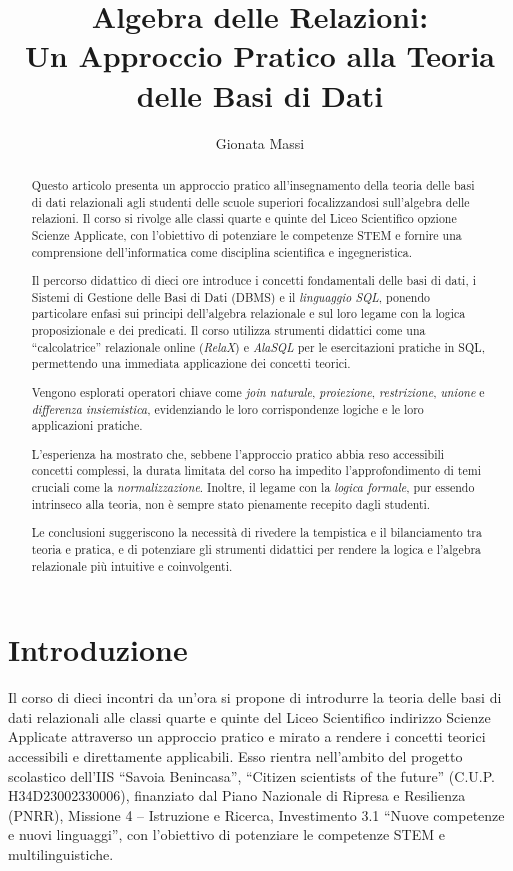 \documentclass[withtimes]{easychair}
\title{Algebra delle Relazioni:\\Un Approccio Pratico alla Teoria delle
Basi di Dati}
\author{
Gionata Massi%
}
\institute{
   Istituto di Istruzione Superiore Savoia Benincasa\\
   Ancona, Italia\\
   \email{gionata.massi@savoiabenincasa.it}
}
\theoremstyle{definition}
\begin{document}
\maketitle


\begin{abstract}
Questo articolo presenta un approccio pratico all'insegnamento della teoria delle basi di dati relazionali agli studenti delle scuole superiori focalizzandosi sull'algebra delle relazioni. Il corso si rivolge alle classi quarte e quinte del Liceo Scientifico opzione Scienze Applicate, con l'obiettivo di potenziare le competenze STEM e fornire una comprensione  dell'informatica come disciplina scientifica e ingegneristica.

Il percorso didattico di dieci ore introduce i concetti fondamentali delle basi di dati, i Sistemi di Gestione delle Basi di Dati (DBMS) e il \emph{linguaggio SQL}, ponendo particolare enfasi sui principi dell'algebra relazionale e sul loro legame con la logica proposizionale e dei predicati. Il corso utilizza strumenti didattici come una ``calcolatrice'' relazionale online (\emph{RelaX}) e \emph{AlaSQL} per le esercitazioni pratiche in SQL, permettendo una immediata applicazione dei concetti teorici.

Vengono esplorati operatori chiave come \emph{join naturale}, \emph{proiezione}, \emph{restrizione}, \emph{unione} e \emph{differenza insiemistica}, evidenziando le loro corrispondenze logiche e le loro applicazioni pratiche.

L'esperienza ha mostrato che, sebbene l'approccio pratico abbia reso accessibili concetti complessi, la durata  limitata del corso ha impedito l'approfondimento di temi cruciali come la \emph{normalizzazione}. Inoltre, il legame con la \emph{logica formale}, pur essendo intrinseco alla teoria, non è sempre stato pienamente recepito dagli studenti.

Le conclusioni suggeriscono la necessità di rivedere la tempistica e il bilanciamento tra teoria e pratica, e di potenziare gli strumenti didattici per rendere la logica e l'algebra relazionale più intuitive e coinvolgenti.
\end{abstract}

\section{Introduzione}\label{introduzione}

Il corso di dieci incontri da un'ora si propone di introdurre la teoria delle basi di dati relazionali alle classi quarte e quinte del Liceo Scientifico indirizzo Scienze Applicate attraverso un approccio pratico e mirato a rendere i concetti teorici accessibili e direttamente applicabili. Esso rientra nell'ambito del progetto scolastico dell'IIS ``Savoia Benincasa'', ``Citizen scientists of the future'' (C.U.P. H34D23002330006), finanziato dal Piano Nazionale di Ripresa e Resilienza (PNRR), Missione 4 -- Istruzione e Ricerca, Investimento 3.1 ``Nuove competenze e nuovi linguaggi'', con l'obiettivo di potenziare le competenze STEM e multilinguistiche.
\end{document}
